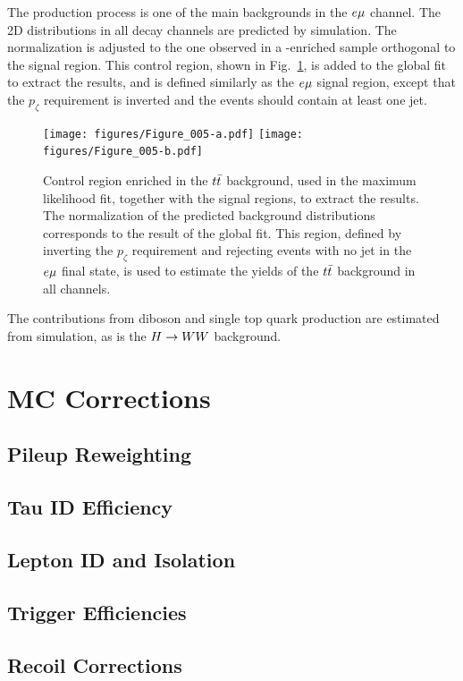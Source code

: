 The \ttbar production process is one of the main backgrounds in the $e\mu$ channel.
The 2D distributions in all decay channels are predicted by simulation. The normalization is
adjusted to the one observed in a \ttbar-enriched sample orthogonal to the signal region. This control
region, shown in Fig.~\ref{fig:CR2},
is added to the global fit to extract the results, and is defined similarly as the $e\mu$ signal region, except that the $p_\zeta$ requirement
is inverted and the events should contain at least one jet.

\begin{figure}[htb]
\centering
     \texttt{[image: figures/Figure\_005-a.pdf]}
     \texttt{[image: figures/Figure\_005-b.pdf]}
     \caption{Control region enriched in the $t\bar{t}$ background, used in the maximum likelihood fit, together with the signal regions, to extract the results. The normalization of the predicted background distributions corresponds to the result of the global fit. This region, defined by inverting the $p_\zeta$ requirement and rejecting events with no jet in the $e\mu$ final state,  is used to estimate the
yields of the $t\bar{t}$ background in all channels.}
     \label{fig:CR2}
\end{figure}

The contributions from diboson and single top quark production are estimated from simulation, as is the $H\to WW$ background.

\pagebreak

\section{MC Corrections}
\label{sec:mc_corrections}
\subsection{Pileup Reweighting}
\subsection{Tau ID Efficiency}
\subsection{Lepton ID and Isolation}
\subsection{Trigger Efficiencies}
\subsection{Recoil Corrections}
